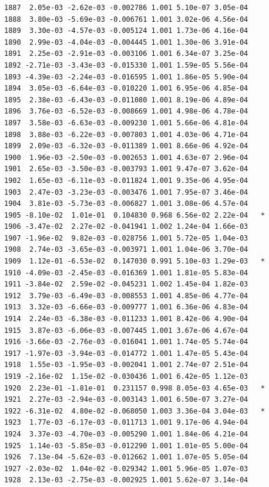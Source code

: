 \documentclass[
  letterpaper,
  DIV=11,
  numbers=noendperiod]{scrartcl}
\begin{document}
\begin{verbatim}
1887  2.05e-03 -2.62e-03 -0.002786 1.001 5.10e-07 3.05e-04    
1888  3.80e-03 -5.69e-03 -0.006761 1.001 3.02e-06 4.56e-04    
1889  3.30e-03 -4.57e-03 -0.005124 1.001 1.73e-06 4.16e-04    
1890  2.99e-03 -4.04e-03 -0.004445 1.001 1.30e-06 3.91e-04    
1891  2.25e-03 -2.91e-03 -0.003106 1.001 6.34e-07 3.25e-04    
1892 -2.71e-03 -3.43e-03 -0.015330 1.001 1.59e-05 5.56e-04    
1893 -4.39e-03 -2.24e-03 -0.016595 1.001 1.86e-05 5.90e-04    
1894  3.05e-03 -6.64e-03 -0.010220 1.001 6.95e-06 4.85e-04    
1895  2.38e-03 -6.43e-03 -0.011080 1.001 8.19e-06 4.89e-04    
1896  3.76e-03 -6.52e-03 -0.008669 1.001 4.98e-06 4.78e-04    
1897  3.58e-03 -6.63e-03 -0.009230 1.001 5.66e-06 4.81e-04    
1898  3.88e-03 -6.22e-03 -0.007803 1.001 4.03e-06 4.71e-04    
1899  2.09e-03 -6.32e-03 -0.011389 1.001 8.66e-06 4.92e-04    
1900  1.96e-03 -2.50e-03 -0.002653 1.001 4.63e-07 2.96e-04    
1901  2.65e-03 -3.50e-03 -0.003793 1.001 9.47e-07 3.62e-04    
1902  1.65e-03 -6.11e-03 -0.011824 1.001 9.35e-06 4.95e-04    
1903  2.47e-03 -3.23e-03 -0.003476 1.001 7.95e-07 3.46e-04    
1904  3.81e-03 -5.73e-03 -0.006827 1.001 3.08e-06 4.57e-04    
1905 -8.10e-02  1.01e-01  0.104830 0.968 6.56e-02 2.22e-04   *
1906 -3.47e-02  2.27e-02 -0.041941 1.002 1.24e-04 1.66e-03    
1907 -1.96e-02  9.82e-03 -0.028756 1.001 5.72e-05 1.04e-03    
1908  2.74e-03 -3.65e-03 -0.003971 1.001 1.04e-06 3.70e-04    
1909  1.12e-01 -6.53e-02  0.147030 0.991 5.10e-03 1.29e-03   *
1910 -4.09e-03 -2.45e-03 -0.016369 1.001 1.81e-05 5.83e-04    
1911 -3.84e-02  2.59e-02 -0.045231 1.002 1.45e-04 1.82e-03    
1912  3.79e-03 -6.49e-03 -0.008553 1.001 4.85e-06 4.77e-04    
1913  3.32e-03 -6.66e-03 -0.009777 1.001 6.36e-06 4.83e-04    
1914  2.24e-03 -6.38e-03 -0.011233 1.001 8.42e-06 4.90e-04    
1915  3.87e-03 -6.06e-03 -0.007445 1.001 3.67e-06 4.67e-04    
1916 -3.66e-03 -2.76e-03 -0.016041 1.001 1.74e-05 5.74e-04    
1917 -1.97e-03 -3.94e-03 -0.014772 1.001 1.47e-05 5.43e-04    
1918  1.55e-03 -1.95e-03 -0.002041 1.001 2.74e-07 2.51e-04    
1919 -2.16e-02  1.15e-02 -0.030436 1.001 6.42e-05 1.12e-03    
1920  2.23e-01 -1.81e-01  0.231157 0.998 8.05e-03 4.65e-03   *
1921  2.27e-03 -2.94e-03 -0.003143 1.001 6.50e-07 3.27e-04    
1922 -6.31e-02  4.80e-02 -0.068050 1.003 3.36e-04 3.04e-03   *
1923  1.77e-03 -6.17e-03 -0.011713 1.001 9.17e-06 4.94e-04    
1924  3.37e-03 -4.70e-03 -0.005290 1.001 1.84e-06 4.21e-04    
1925  1.14e-03 -5.85e-03 -0.012290 1.001 1.01e-05 5.00e-04    
1926  7.13e-04 -5.62e-03 -0.012662 1.001 1.07e-05 5.05e-04    
1927 -2.03e-02  1.04e-02 -0.029342 1.001 5.96e-05 1.07e-03    
1928  2.13e-03 -2.75e-03 -0.002925 1.001 5.62e-07 3.14e-04    

\end{verbatim}
\end{document}
